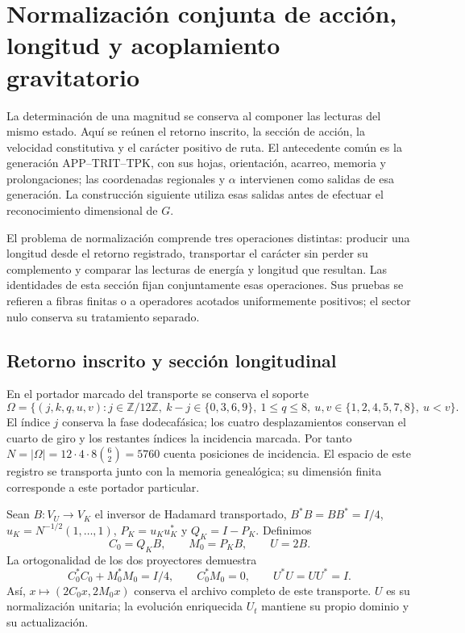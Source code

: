 \clearpage
\section{Normalización conjunta de acción, longitud y acoplamiento gravitatorio}
\label{md:rigidez}

La determinación de una magnitud se conserva al componer las lecturas del
mismo estado. Aquí se reúnen el retorno inscrito, la sección de acción, la
velocidad constitutiva y el carácter positivo de ruta. El antecedente común
es la generación APP--TRIT--TPK, con sus hojas, orientación, acarreo, memoria
y prolongaciones; las coordenadas regionales y $\alpha$ intervienen como
salidas de esa generación. La construcción siguiente utiliza esas salidas
antes de efectuar el reconocimiento dimensional de $G$.

El problema de normalización comprende tres operaciones distintas: producir
una longitud desde el retorno registrado, transportar el carácter sin perder
su complemento y comparar las lecturas de energía y longitud que resultan.
Las identidades de esta sección fijan conjuntamente esas operaciones. Sus
pruebas se refieren a fibras finitas o a operadores acotados uniformemente
positivos; el sector nulo conserva su tratamiento separado.

\subsection{Retorno inscrito y sección longitudinal}
\label{md:rigidez:longitud}

En el portador marcado del transporte se conserva el soporte
\[
 \Omega=\{(j,k,q,u,v):j\in\mathbb Z/12\mathbb Z,\ 
 k-j\in\{0,3,6,9\},\ 1\le q\le8,\
 u,v\in\{1,2,4,5,7,8\},\ u<v\}.
\]
El índice $j$ conserva la fase dodecafásica; los cuatro desplazamientos
conservan el cuarto de giro y los restantes índices la incidencia marcada.
Por tanto $N=|\Omega|=12\cdot4\cdot8\binom62=5760$ cuenta posiciones de
incidencia. El espacio de este registro se transporta junto con la memoria
genealógica; su dimensión finita corresponde a este portador particular.

Sean $B:V_U\to V_K$ el inversor de Hadamard transportado,
$B^*B=BB^*=I/4$, $u_K=N^{-1/2}(1,\ldots,1)$,
$P_K=u_Ku_K^*$ y $Q_K=I-P_K$. Definimos
\[
 C_0=Q_KB,\qquad M_0=P_KB,\qquad U=2B.
\]
La ortogonalidad de los dos proyectores demuestra
\[
 C_0^*C_0+M_0^*M_0=I/4,\qquad C_0^*M_0=0,\qquad U^*U=UU^*=I.
\]
Así, $x\mapsto(2C_0x,2M_0x)$ conserva el archivo completo de este
transporte. $U$ es su normalización unitaria; la evolución enriquecida
$U_t$ mantiene su propio dominio y su actualización.

